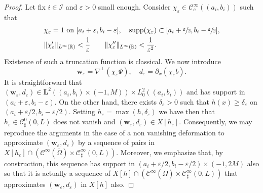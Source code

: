 \documentclass[JEP,XML,SOM,Unicode,NoFloatCountersInSection]{cedram}
\let\mathcal\mathscr
\theoremstyle{remark}
\theoremstyle{definition}
\newcommand{\wg}{\boldsymbol{w}}
\newcommand{\BS}[1]{\boldsymbol{#1}}
\begin{document}
\begin{proof}
Let fix $i \in \mathcal I$ and $\varepsilon>0$ small enough. Consider $\chi_{\varepsilon} \in \mathcal{C}^{\infty}_{c}((a_{i},b_{i}))$ such that
\[
\begin{aligned}
& \chi_{\varepsilon}=1 \text{ on $[a_{i}+\varepsilon,b_{i}-\varepsilon]$},
\quad
\text{supp}(\chi_{\varepsilon})\subset[a_{i}+\sfrac{\varepsilon}{2},b_{i}-\sfrac{\varepsilon}{2}], \\
& \|\chi_{\varepsilon}'\|_{L^{\infty}(\mathbb R)}<\frac{1}{\varepsilon}
\qquad \|\chi_{\varepsilon}''\|_{L^{\infty}(\mathbb R)}<\frac{1}{\varepsilon^{2}}.
\end{aligned}
\]
Existence of such a truncation function is classical.
We now introduce
\[
\wg_\varepsilon=\nabla^{\perp}(\chi_{\varepsilon}\Psi), \quad
d_{\varepsilon} = \partial_x (\chi_{\varepsilon}b).
\]
It is straightforward that $(\wg_{\varepsilon},d_{\varepsilon}) \in \BS L^2((a_{i},b_{i}) \times (-1,M)) \times L^2_0((a_{i},b_{i}))$ and has support in $(a_i+\varepsilon,b_i-\varepsilon)$. On the other hand, there exists $\delta_{\varepsilon}>0$ such that $h(x)\geq \delta_{\varepsilon}$
on $(a_i+\varepsilon/2,b_i-\varepsilon/2)$. Setting $h_{\varepsilon} = \max(h,\delta_{\varepsilon})$ we have then that $h_{\varepsilon} \in \mathcal C^0_{\sharp}(0,L)$ does not vanish and $(\wg_{\varepsilon},d_{\varepsilon}) \in X[h_{\varepsilon}]$. Consequently, we may reproduce the arguments in the case of a non vanishing deformation to approximate $(\wg_{\varepsilon},d_{\varepsilon})$ by a sequence of pairs
in $X[h_{\varepsilon}] \cap (\mathcal C^{\infty}(\overline{\Omega}) \times \mathcal C^{\infty}_{\sharp}(0,L))$. Moreover, we emphasize that,
by construction, this sequence has support in $(a_i+\varepsilon/2,b_i-\varepsilon/2)\times (-1,2M)$ also so that it is actually a sequence of $X[h] \cap (\mathcal C^{\infty}(\overline{\Omega}) \times \mathcal C^{\infty}_{\sharp}(0,L))$ that approximates $(\wg_{\varepsilon},d_{\varepsilon})$ in $X[h]$ also.


\end{proof}
\end{document}
